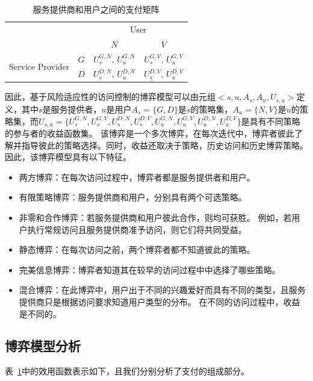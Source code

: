 \begin{table}[htb]
	\caption{服务提供商和用户之间的支付矩阵}\label{tab:payoff}
	\centering 
	\begin{tabular}{cccc}
		\toprule
		\multicolumn{2}{c}{\multirow{2}{*}{}} & \multicolumn{2}{c}{User} \\
		\cline{3-4}
		& & $N$ & $V$ \\	
		\hline
		\multirow{2}{*}{Service Provider} & $G$ &$U_s^{G,N}$, $U_u^{G,N}$ & $U_s^{G,V}$, $U_u^{G,V}$\\
		\cline{2-4}
		& $D$ & $U_s^{D,N}$, $U_u^{D,N}$ & $U_s^{D,V}$, $U_u^{D,V}$\\
		\toprule
	\end{tabular}
\end{table}


因此，基于风险适应性的访问控制的博弈模型可以由元组$<s,u,A_s,A_u,U_{s,u}>$定义，其中$s$是服务提供者，$u$是用户$A_s=\{G,D\}$是$s$的策略集，$A_u=\{N,V\}$是$u$的策略集，而$U_{s,u}=\{U_s^{G,N}, U_s^{G,V}, U_s^{D,N}, U_s^{D,V}, U_u^{G,N}, U_u^{G,V}, U_u^{D,N}, U_u^{D,V}\}$是具有不同策略的参与者的收益函数集。 该博弈是一个多次博弈，在每次迭代中，博弈者彼此了解并指导彼此的策略选择。同时，收益还取决于策略，历史访问和历史博弈策略。 因此，该博弈模型具有以下特征。
\begin{itemize}
	\item 两方博弈：在每次访问过程中，博弈者都是服务提供者和用户。
	\item 有限策略博弈：服务提供商和用户，分别具有两个可选策略。
	\item 非零和合作博弈：若服务提供商和用户彼此合作，则均可获胜。 例如，若用户执行常规访问且服务提供商准予访问，则它们将共同受益。
	\item 静态博弈：在每次访问之前，两个博弈者都不知道彼此的策略。
	\item 完美信息博弈：博弈者知道其在较早的访问过程中中选择了哪些策略。
	\item 混合博弈：在此博弈中，用户出于不同的兴趣爱好而具有不同的类型，且服务提供商只是根据访问要求知道用户类型的分布。 在不同的访问过程中，收益是不同的。
\end{itemize}

\subsection{博弈模型分析}

表~\ref{tab:payoff}中的效用函数表示如下，且我们分别分析了支付的组成部分。

